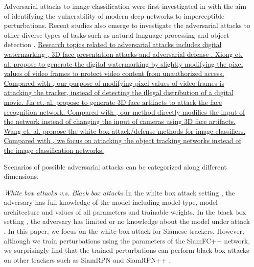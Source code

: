 \documentclass[journal]{IEEEtran}
\begin{document}
Adversarial attacks \cite{9169672} to image classification were first investigated in \cite{intriguing} with the aim of identifying the vulnerability of modern deep networks to imperceptible perturbations. 
Recent studies also emerge to investigate the adversarial attacks to other diverse types of tasks such as natural language processing \cite{generating,zhang2020adversarial,morris2020textattack,jin2020bert} and object detection \cite{wei2019transferable}.
\uline{
Research topics related to adversarial attacks includes digital watermarking \cite{9343885}, 3D face presentation attacks \cite{9294085} and adversarial defense \cite{9169672}.
Xiong et. al. \cite{9343885} propose to generate the digital watermarking by slightly modifying the pixel values of video frames to protect video content from unauthorized access. Compared with \cite{9343885}, our purpose of modifying pixel values of video frames is attacking the tracker, instead of detecting the illegal distribution of a digital movie.
Jia et. al. \cite{9294085} propose to generate 3D face artifacts to attack the face recognition network. Compared with \cite{9294085}, our method directly modifies the input of the network instead of changing the input of cameras using 3D face artifacts.
Wang et. al. \cite{9169672} propose the white-box attack/defense methods for image classifiers. Compared with \cite{9169672}, we focus on attacking the object tracking networks instead of the image classification networks.
}

Scenarios of possible adversarial attacks can be categorized along different dimensions.

\textit{White box attacks v.s. Black box attacks} In the white box attack setting \cite{meng2019white}, the adversary has full knowledge of the model including model type, model architecture and values of all parameters and trainable weights. In the black box setting \cite{cheng2018query,li2019nattack,papernot2017practical,li2020projection}, the adversary has limited or no knowledge about the model under attack \cite{kurakin2018adversarial}. In this paper, we focus on the white box attack for Siamese trackers. However, although we train perturbations using the parameters of the SiamFC++ \cite{SiamFC++} network, we surprisingly find that the trained perturbations can perform black box attacks on other trackers such as SiamRPN \cite{SiamRPN} and SiamRPN++ \cite{SiamRPN++}.
\end{document}

